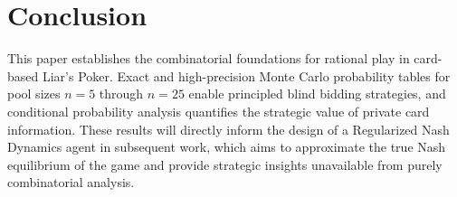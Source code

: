 \documentclass[11pt, a4paper]{article}
\theoremstyle{definition}
\begin{document}
\section{Conclusion}

This paper establishes the combinatorial foundations for rational play in card-based
Liar's Poker. Exact and high-precision Monte Carlo probability tables for pool sizes
$n = 5$ through $n = 25$ enable principled blind bidding strategies, and conditional
probability analysis quantifies the strategic value of private card information. These
results will directly inform the design of a Regularized Nash Dynamics agent in
subsequent work, which aims to approximate the true Nash equilibrium of the game and
provide strategic insights unavailable from purely combinatorial analysis.

\printbibliography
\end{document}
